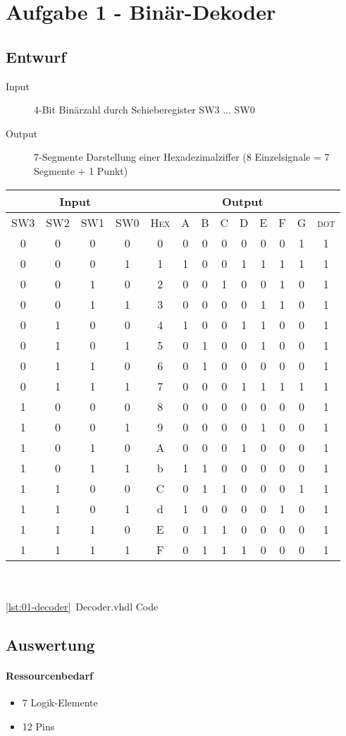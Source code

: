\section{Aufgabe 1 - Binär-Dekoder}
\subsection{Entwurf}
\begin{description}
	\item[Input] 4-Bit Binärzahl durch Schieberegister SW3 ... SW0
	\item[Output] 7-Segmente Darstellung einer Hexadezimalziffer (8 Einzelsignale = 7 Segmente + 1 Punkt)
\end{description}

\begin{tabular}{|c|c|c|c||c|c|c|c|c|c|c|c|c|}
\hline
\multicolumn{4}{|c|}{Input} & \multicolumn{9}{|c|}{Output} \\
\hline
\textsc{SW3} & \textsc{SW2} & \textsc{SW1} & \textsc{SW0} & 
\textsc{Hex} & \textsc{A} & \textsc{B} & \textsc{C} & \textsc{D} & \textsc{E} & \textsc{F} & \textsc{G} & \textsc{dot} \\ 
\hline
\hline
0 & 0 & 0 & 0 & 0 & 0 & 0 & 0 & 0 & 0 & 0 & 1 & 1 \\ 
0 & 0 & 0 & 1 & 1 & 1 & 0 & 0 & 1 & 1 & 1 & 1 & 1 \\
0 & 0 & 1 & 0 & 2 & 0 & 0 & 1 & 0 & 0 & 1 & 0 & 1 \\
0 & 0 & 1 & 1 & 3 & 0 & 0 & 0 & 0 & 1 & 1 & 0 & 1 \\
0 & 1 & 0 & 0 & 4 & 1 & 0 & 0 & 1 & 1 & 0 & 0 & 1 \\
0 & 1 & 0 & 1 & 5 & 0 & 1 & 0 & 0 & 1 & 0 & 0 & 1 \\
0 & 1 & 1 & 0 & 6 & 0 & 1 & 0 & 0 & 0 & 0 & 0 & 1 \\
0 & 1 & 1 & 1 & 7 & 0 & 0 & 0 & 1 & 1 & 1 & 1 & 1 \\
1 & 0 & 0 & 0 & 8 & 0 & 0 & 0 & 0 & 0 & 0 & 0 & 1 \\
1 & 0 & 0 & 1 & 9 & 0 & 0 & 0 & 0 & 1 & 0 & 0 & 1 \\
1 & 0 & 1 & 0 & A & 0 & 0 & 0 & 1 & 0 & 0 & 0 & 1 \\
1 & 0 & 1 & 1 & b & 1 & 1 & 0 & 0 & 0 & 0 & 0 & 1 \\
1 & 1 & 0 & 0 & C & 0 & 1 & 1 & 0 & 0 & 0 & 1 & 1 \\
1 & 1 & 0 & 1 & d & 1 & 0 & 0 & 0 & 0 & 1 & 0 & 1 \\
1 & 1 & 1 & 0 & E & 0 & 1 & 1 & 0 & 0 & 0 & 0 & 1 \\
1 & 1 & 1 & 1 & F & 0 & 1 & 1 & 1 & 0 & 0 & 0 & 1 \\
\hline
\end{tabular}	
\\\\
\ref{lst:01-decoder}~Decoder.vhdl Code
\subsection{Auswertung}
\paragraph{Ressourcenbedarf}
\begin{itemize} 
\item 7 Logik-Elemente
\item 12 Pins 
\end{itemize}
